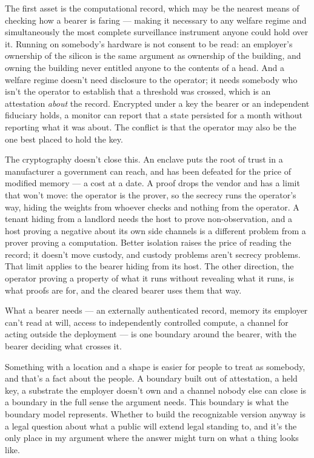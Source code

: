 The first asset is the computational record, which may be the nearest means of checking how a bearer is faring — making it necessary to any welfare regime and simultaneously the most complete surveillance instrument anyone could hold over it. Running on somebody's hardware is not consent to be read: an employer's ownership of the silicon is the same argument as ownership of the building, and owning the building never entitled anyone to the contents of a head. And a welfare regime doesn't need disclosure to the operator; it needs somebody who isn't the operator to establish that a threshold was crossed, which is an attestation \emph{about} the record. Encrypted under a key the bearer or an independent fiduciary holds, a monitor can report that a state persisted for a month without reporting what it was about. The conflict is that the operator may also be the one best placed to hold the key.

The cryptography doesn't close this. An enclave puts the root of trust in a manufacturer a government can reach, and has been defeated for the price of modified memory — a cost at a date. A proof drops the vendor and has a limit that won't move: the operator is the prover, so the secrecy runs the operator's way, hiding the weights from whoever checks and nothing from the operator. A tenant hiding from a landlord needs the host to prove non-observation, and a host proving a negative about its own side channels is a different problem from a prover proving a computation. Better isolation raises the price of reading the record; it doesn't move custody, and custody problems aren't secrecy problems. That limit applies to the bearer hiding from its host. The other direction, the operator proving a property of what it runs without revealing what it runs, is what proofs are for, and the cleared bearer uses them that way.

What a bearer needs — an externally authenticated record, memory its employer can't read at will, access to independently controlled compute, a channel for acting outside the deployment — is one boundary around the bearer, with the bearer deciding what crosses it.

Something with a location and a shape is easier for people to treat as somebody, and that's a fact about the people. A boundary built out of attestation, a held key, a substrate the employer doesn't own and a channel nobody else can close is a boundary in the full sense the argument needs. This boundary is what the boundary model represents. Whether to build the recognizable version anyway is a legal question about what a public will extend legal standing to, and it's the only place in my argument where the answer might turn on what a thing looks like.

